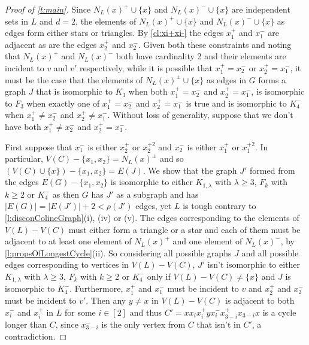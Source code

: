 \documentclass[12pt]{article}
\theoremstyle{definition}
\begin{document}
\begin{proof}[Proof of \cref{t:main}]
Since $N_L(x)^+ \cup \{x\}$ and $N_L(x)^- \cup \{x\}$ are independent sets in $L$ and $d=2$, the elements of $N_L(x)^+ \cup \{x\}$ and $N_L(x)^- \cup \{x\}$ as edges form either stars or triangles. By \cref{cl:xi+xi-} the edges $x_1^+$ and $x_1^-$ are adjacent as are the edges $x_2^+$ and $x_2^-$. Given both these constraints and noting that $N_L(x)^+$ and $N_L(x)^-$ both have cardinality 2 and their elements are incident to $v$ and $v'$ respectively, while it is possible that $x_1^+=x_2^-$ or $x_2^+=x_1^-$, it must be the case that the elements of $N_L(x)^\pm \cup \{x\}$ as edges in $G$
forms a graph $J$ that is isomorphic to $K_3$ when both $x_1^+=x_2^-$ and $x_2^+=x_1^-$, is isomorphic to $F_3$  when exactly one of $x_1^+=x_2^-$ and $x_2^+=x_1^-$ is true and is isomorphic to $K_4^-$ when $x_1^+\neq x_2^-$ and $x_2^+ \neq x_1^-$.
Without loss of generality, suppose that we don't have both $x_1^+ \neq x_2^-$ and $x_2^+=x_1^-$.

First suppose that $x_1^- $ is either $x_2^+$ or $x_2^{+2}$ and $x_2^- $ is either $x_1^+$ or $x_1^{+2}$. 
In particular, $V(C)-\{x_1,x_2\} = N_L(x)^\pm$ and so $(V(C)\cup\{x\})-\{x_1,x_2\}= E(J)$.
We show that the graph $J'$ formed from the edges $E(G)-\{x_1,x_2\}$  is isomorphic to either $K_{1,\lambda}$ with $\lambda\geq 3$, $F_k$ with $k \geq 2$ or $K_4^-$ as then $G$ has $J'$ as a subgraph and has  $|E(G)|= |E(J')|+2< \rho(J')$ edges, yet $L$ is tough contrary to \cref{l:disconColineGraph}(i), (iv) or (v).
The edges corresponding to the elements of $V(L)-V(C)$ must either form a triangle or a star and each of them must be adjacent to at least one element of $N_L(x)^+$ and one element of $N_L(x)^-$, by \cref{l:propsOfLongestCycle}(ii). 
So considering all possible graphs $J$ and all possible edges corresponding to vertices in $V(L)-V(C)$,  $J'$ isn't isomorphic to either $K_{1,\lambda}$ with $\lambda\geq 3$, $F_k$ with $k \geq 2$ or $K_4^-$ only if $V(L)-V(C) \neq \{x\}$ and %
$J$ is isomorphic to $K_4^-$. Furthermore, 
 $x_1^+$ and $x_1^-$ must be incident to $v$ and $x_2^+$ and $x_2^-$ must be incident to $v'$. 
Then any $y \neq x$ in $V(L)-V(C)$ is adjacent to both $x_i^-$ and $x_i^+$ in $L$ for some $i\in [2]$ and thus
$C' = x x_i x_{i}^+ y x_i^- x_{3-i}^+ x_{3-i} x$ is a cycle longer than $C$, since $x_{3-i}^-$ is the only vertex  from $C$ that isn't in $C'$, a contradiction.


\end{proof}
\end{document}
